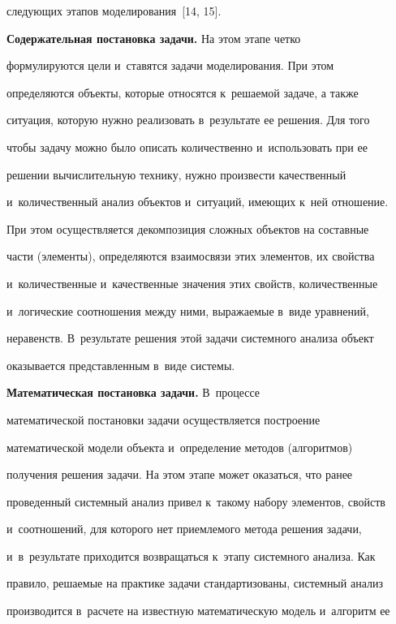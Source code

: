 сле\-ду\-ющих этапов моделирования~[14, 15].


    


    \textbf{Содержательная постановка задачи.} На этом этапе четко 


формулируются цели и~ставятся задачи моделирования. При этом 


определяются объекты, которые относятся к~решаемой задаче, а также 


ситуация, которую нужно реализовать в~результате ее решения. Для того 


чтобы задачу можно было описать количественно и~использовать при ее 


решении вычислительную технику, нужно произвести качественный 


и~количественный анализ объектов и~ситуаций, имеющих к~ней отношение. 


При этом осуществляется декомпозиция сложных объектов на составные 


части (элементы), определяются взаимосвязи этих элементов, их свойства 


и~количественные и~качественные значения этих свойств, количественные 


и~логические соотношения между ними, выражаемые в~виде уравнений, 


неравенств. В~результате решения этой задачи системного анализа объект 


оказывается представленным в~виде системы.


    


    \textbf{Математическая постановка задачи.} В~процессе 


математической постановки задачи осуществляется построение 


математической модели объекта и~определение методов (алгоритмов) 


получения решения задачи. На этом этапе может оказаться, что ранее 


проведенный системный анализ привел к~такому набору элементов, свойств 


и~соотношений, для которого нет приемлемого метода решения задачи, 


и~в~результате приходится возвращаться к~этапу системного анализа. Как 


правило, решаемые на практике задачи стандартизованы, системный анализ 


производится в~расчете на известную математическую модель и~алгоритм ее 


